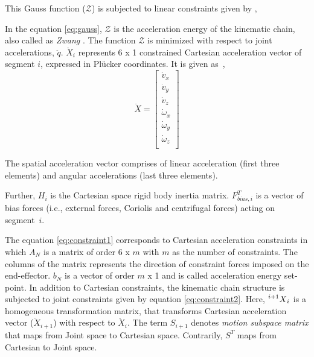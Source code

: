 This Gauss function ($\mathcal{Z}$) is subjected to linear constraints given by \cite{shakhimardanov2015composable},
 
 In the equation \ref{eq:gauss},  $\mathcal{Z}$ is the acceleration energy of the kinematic chain, also called as \textit{Zwang} \cite{shakhimardanov2015composable}.  The function $\mathcal{Z}$ is minimized with respect to joint accelerations, $\ddot{q}$. $\ddot{X}_i$ represents 6 x 1 constrained Cartesian acceleration vector of segment $i$, expressed in Pl{\"u}cker coordinates. It is given as~\cite{featherstone2014rigid},
 \begin{equation}\label{eq:plucker}
	 \ddot{X} = \begin{bmatrix}
		 \dot{v}_x \\
		 \dot{v}_y \\
		 \dot{v}_z \\
		 \dot{\omega}_x \\
		 \dot{\omega}_y \\
		 \dot{\omega}_z \\
	 \end{bmatrix}
 \end{equation}
 
 The spatial acceleration vector comprises of linear acceleration (first three elements) and angular accelerations (last three elements). 
 
 
 Further, $H_i$ is the Cartesian space rigid body inertia matrix. $F_{bias, i}^T$ is a vector of bias forces (i.e., external forces, Coriolis and centrifugal forces) acting on segment~$i$. 
 
 The equation \ref{eq:constraint1} corresponds to Cartesian acceleration constraints in which $A_N$ is a matrix of order 6 x $m$ with $m$ as the number of constraints. The columns of the matrix represents the direction of constraint forces imposed on the end-effector. $b_N$ is a vector of order $m$ x 1 and is called acceleration energy set-point. In addition to Cartesian constraints, the kinematic chain structure is subjected to joint constraints given by equation \ref{eq:constraint2}. Here, $\prescript{i+1}{}{X}_i$ is a homogeneous transformation matrix, that transforms Cartesian acceleration vector ($\ddot{X}_{i+1}$) with respect to $\ddot{X}_i$. The term $S_{i+1}$ denotes \textit{motion subspace matrix} that maps from Joint space to Cartesian space. Contrarily, $S^T$ maps from Cartesian to Joint space.

